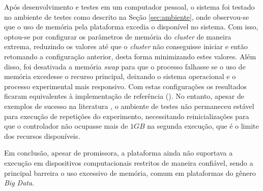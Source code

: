 Após desenvolvimento e testes em um computador pessoal, o sistema foi testado no
ambiente de testes como descrito na Seção \ref{sec:ambiente}, onde observou-se
que o uso de memória pela plataforma \flink excedia o disponível no sistema.
Com isso, optou-se por configurar os parâmetros de memória do \emph{cluster}
de maneira extrema, reduzindo os valores até que o \emph{cluster} não conseguisse
iniciar e então retomando a configuração anterior, desta forma minimizando estes
valores.
Além disso, foi desativada a memória \emph{swap} para que o processo falhasse se
o uso de memória excedesse o recurso principal, deixando o sistema operacional e
o processo experimental mais responsivo.
Com estas configurações os resultados ficaram equivalentes à implementação de
referência ().
No entanto, apesar de exemplos de sucesso na literatura
\cite{lee2017data,Greco2019wearableStream,battulga2020fogguru}, o ambiente de
testes não permaneceu estável para execução de repetições do experimento,
necessitando reinicializações para que o controlador não ocupasse mais de $1GB$
na segunda execução, que é o limite dos recursos disponíveis.

Em conclusão, apesar de promissora, a plataforma \flink ainda não suportava a
execução em dispositivos computacionais restritos de maneira confiável, sendo a
principal barreira o uso excessivo de memória, comum em plataformas do gênero
\emph{Big Data}.

